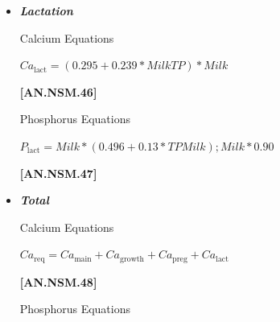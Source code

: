 \begin{refsection}
\begin{itemize}
\begin{itemize}
The denominator, 715 kg, is the average cow weight in the study by House and Bell (1993); therefore, the pregnancy (gestation) requirement is scaled to that BW. For details see Page 107 in the Minerals chapter of \textcite{nrc2021}. IF DOP $<$ 190; then it is assumed that Ca\_Preg is equal to zero.
\vspace{0.25cm}

    \item \textbf{\textit{Lactation}} 
    \vspace{0.25cm}
    
Calcium Equations
\vspace{0.25cm}

    \begin{center}
    \(Ca_{\text{lact}} =  (0.295 + 0.239 * MilkTP) * Milk\)
    \end{center}

\vspace{0.5cm}
            {\raggedleft \textbf{[AN.NSM.46]}\par}
            \vspace{0.5cm}

Phosphorus Equations
\vspace{0.25cm}

    \begin{center}
    \(P_{\text{lact}} =  Milk * (0.496 + 0.13 * TPMilk); Milk * 0.90\)
    \end{center}

\vspace{0.5cm}
            {\raggedleft \textbf{[AN.NSM.47]}\par}
            \vspace{0.5cm} 

    \item \textbf{\textit{Total}} 
    \vspace{0.25cm}
    
Calcium Equations
\vspace{0.25cm}

    \begin{center}
    \(Ca_{\text{req}} = Ca_{\text{main}} + Ca_{\text{growth}} + Ca_{\text{preg}} + Ca_{\text{lact}}\)
    \end{center}

\vspace{0.5cm}
            {\raggedleft \textbf{[AN.NSM.48]}\par}
            \vspace{0.5cm}

Phosphorus Equations
\vspace{0.25cm}


\end{itemize}
\end{itemize}
\end{refsection}
